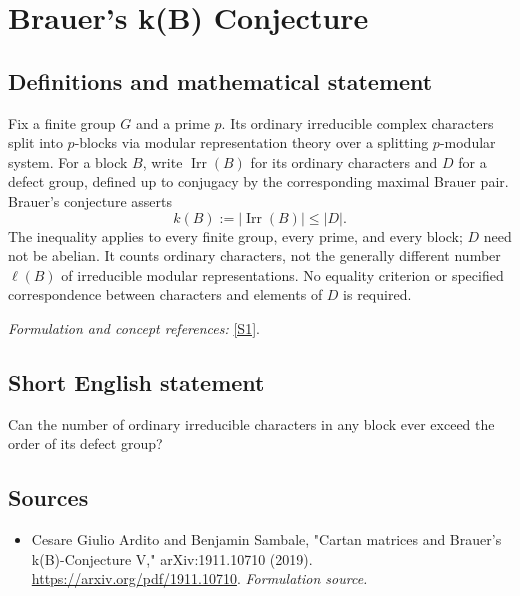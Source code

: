 \documentclass[11pt]{article}
\begin{document}
\section*{\texorpdfstring{Brauer's k(B) Conjecture}{Brauer's k(B) Conjecture}}\label{352}
\subsection{Definitions and mathematical statement}
Fix a finite group $G$ and a prime $p$. Its ordinary irreducible complex characters split into $p$-blocks via modular representation theory over a splitting $p$-modular system. For a block $B$, write $\operatorname{Irr}(B)$ for its ordinary characters and $D$ for a defect group, defined up to conjugacy by the corresponding maximal Brauer pair. Brauer's conjecture asserts
\[
 k(B):=|\operatorname{Irr}(B)|\le |D|.
\]
The inequality applies to every finite group, every prime, and every block; $D$ need not be abelian. It counts ordinary characters, not the generally different number $\ell(B)$ of irreducible modular representations. No equality criterion or specified correspondence between characters and elements of $D$ is required.
\par\smallskip\textit{Formulation and concept references:} \href{https://arxiv.org/pdf/1911.10710}{[S1]}.

\subsection{Short English statement}
Can the number of ordinary irreducible characters in any block ever exceed the order of its defect group?
\subsection{Sources}
\begin{itemize}
\item[S1]Cesare Giulio Ardito and Benjamin Sambale, "Cartan matrices and Brauer's k(B)-Conjecture V," arXiv:1911.10710 (2019).
\url{https://arxiv.org/pdf/1911.10710}.
\textit{Formulation source.}
\end{itemize}
\end{document}
